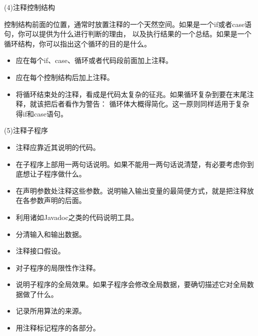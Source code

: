 \documentclass{article}
\begin{document}
\par
(4)注释控制结构
\par
控制结构前面的位置，通常时放置注释的一个天然空间。如果是一个if或者case语句，你可以提供为什么进行判断的理由，
以及执行结果的一个总结。如果是一个循环结构，你可以指出这个循环的目的是什么。
\begin{itemize}
    \item 应在每个if、case、循环或者代码段前面加上注释。
    \item 应在每个控制结构后加上注释。
    \item 将循环结束处的注释，看成是代码太复杂的征兆。如果循环复杂到要在末尾注释，就该把后者看作为警告：
    循环体大概得简化。这一原则同样适用于复杂得if和case语句。
\end{itemize}

\par
(5)注释子程序
\par
\begin{itemize}
    \item 注释应靠近其说明的代码。
    \item 在子程序上部用一两句话说明。如果不能用一两句话说清楚，有必要考虑你到底想让子程序做什么。
    \item 在声明参数处注释这些参数。说明输入输出变量的最简便方式，就是把注释放在各参数声明的后面。
    \item 利用诸如Javadoc之类的代码说明工具。
    \item 分清输入和输出数据。
    \item 注释接口假设。
    \item 对子程序的局限性作注释。
    \item 说明子程序的全局效果。如果子程序会修改全局数据，要确切描述它对全局数据做了什么。
    \item 记录所用算法的来源。
    \item 用注释标记程序的各部分。
\end{itemize}
\end{document}
